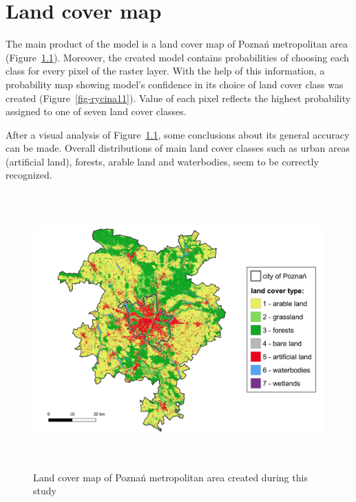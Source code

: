 \documentclass{amuthesis}
\begin{document}

\hypertarget{sec-results-map}{%
\chapter{Land cover map}\label{sec-results-map}}

The main product of the model is a land cover map of Poznań metropolitan
area (Figure~\ref{fig-rycina9}). Moreover, the created model contains
probabilities of choosing each class for every pixel of the raster
layer. With the help of this information, a probability map showing
model's confidence in its choice of land cover class was created
(Figure~\ref{fig-rycina11}). Value of each pixel reflects the highest
probability assigned to one of seven land cover classes.

After a visual analysis of Figure~\ref{fig-rycina9}, some conclusions
about its general accuracy can be made. Overall distributions of main
land cover classes such as urban areas (artificial land), forests,
arable land and waterbodies, seem to be correctly recognized.

\begin{figure}[H]

{\centering \includegraphics[width=5.875in,height=4.16667in]{./figures/result_map-lc.png}

}

\caption{\label{fig-rycina9}Land cover map of Poznań metropolitan area
created during this study}

\end{figure}
\end{document}
